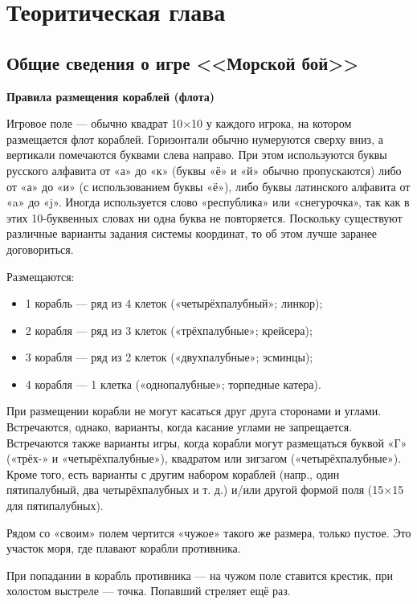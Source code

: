 \chapter{\label{ch:ch01}Теоритическая глава} %
\section{\label{sec:ch01/sec01}Общие сведения о игре <<Морской бой>>}
\textbf{Правила размещения кораблей (флота)}

Игровое поле — обычно квадрат 10×10 у каждого игрока, на котором размещается флот кораблей. Горизонтали обычно нумеруются сверху вниз, а вертикали помечаются буквами слева направо. При этом используются буквы русского алфавита от «а» до «к» (буквы «ё» и «й» обычно пропускаются) либо от «а» до «и» (с использованием буквы «ё»), либо буквы латинского алфавита от «a» до «j». Иногда используется слово «республика» или «снегурочка», так как в этих 10-буквенных словах ни одна буква не повторяется. Поскольку существуют различные варианты задания системы координат, то об этом лучше заранее договориться.

Размещаются:
\begin{itemize}
\item 1 корабль — ряд из 4 клеток («четырёхпалубный»; линкор);
\item 2 корабля — ряд из 3 клеток («трёхпалубные»; крейсера);
\item 3 корабля — ряд из 2 клеток («двухпалубные»; эсминцы);
\item 4 корабля — 1 клетка («однопалубные»; торпедные катера).
\end{itemize}

При размещении корабли не могут касаться друг друга сторонами и углами. Встречаются, однако, варианты, когда касание углами не запрещается. Встречаются также варианты игры, когда корабли могут размещаться буквой «Г» («трёх-» и «четырёхпалубные»), квадратом или зигзагом («четырёхпалубные»). Кроме того, есть варианты с другим набором кораблей (напр., один пятипалубный, два четырёхпалубных и т. д.) и/или другой формой поля (15×15 для пятипалубных).

Рядом со «своим» полем чертится «чужое» такого же размера, только пустое. Это участок моря, где плавают корабли противника.

При попадании в корабль противника — на чужом поле ставится крестик, при холостом выстреле — точка. Попавший стреляет ещё раз.

